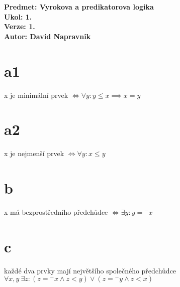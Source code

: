 \documentclass[a4paper]{article}
\begin{document}
\noindent
\textbf{Predmet: Vyrokova a predikatorova logika}\\
\textbf{Ukol: 1.}\\
\textbf{Verze: 1.}\\
\textbf{Autor: David Napravnik}

\section*{a1}
x je minimální prvek $\Leftrightarrow \forall y : y \leq x \implies x=y$


\section*{a2}
x je nejmenší prvek $\Leftrightarrow \forall y : x \leq y$


\section*{b}
x má bezprostředního předchůdce $\Leftrightarrow \exists y : y = {}^-x$


\section*{c}
každé dva prvky mají největšího společného předchůdce\\
$\forall x,y~\exists z : (z = {}^-x \wedge z < y) \vee (z = {}^-y \wedge z < x)$
\end{document}
